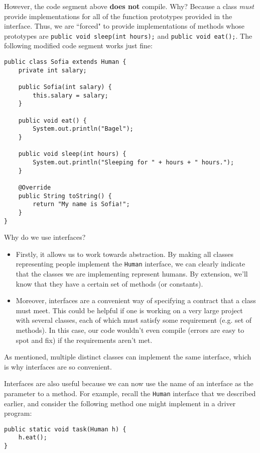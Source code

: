 However, the code segment above \textbf{does not} compile. Why? Because a class \textit{must} provide implementations for all of the function prototypes provided in the interface. Thus, we are ``forced" to provide implementations of methods whose prototypes are \verb!public void sleep(int hours);! and \verb!public void eat();!. The following modified code segment works just fine:


\begin{lstlisting}
public class Sofia extends Human {
    private int salary;
    
    public Sofia(int salary) {
        this.salary = salary;
    }
    
    public void eat() {
        System.out.println("Bagel");
    }
    
    public void sleep(int hours) {
        System.out.println("Sleeping for " + hours + " hours.");
    }
    
    @Override
    public String toString() {
        return "My name is Sofia!";
    }
}
\end{lstlisting}

Why do we use interfaces? 
\begin{itemize}
    \item Firstly, it allows us to work towards abstraction. By making all classes representing people implement the \verb!Human! interface, we can clearly indicate that the classes we are implementing represent humans. By extension, we'll know that they have a certain set of methods (or constants).
    \item Moreover, interfaces are a convenient way of specifying a contract that a class must meet. This could be helpful if one is working on a very large project with several classes, each of which must satisfy some requirement (e.g. set of methods). In this case, our code wouldn't even compile (errors are easy to spot and fix) if the requirements aren't met.
\end{itemize}

As mentioned, multiple distinct classes can implement the same interface, which is why interfaces are so convenient. 

Interfaces are also useful because we can now use the name of an interface as the parameter to a method. For example, recall the \verb!Human! interface that we described earlier, and consider the following method one might implement in a driver program:

\begin{lstlisting}
public static void task(Human h) {
    h.eat();
}
\end{lstlisting}

